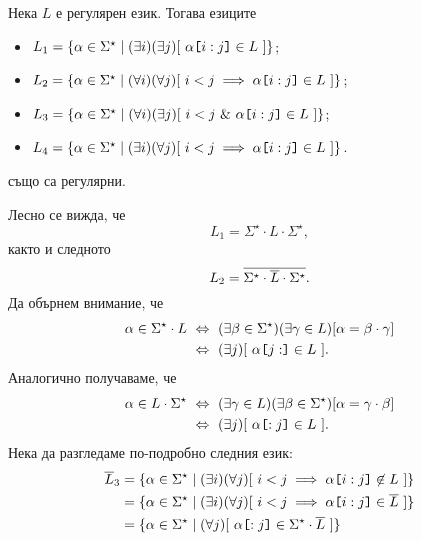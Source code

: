 \begin{extra}

  
\begin{problem}
  Нека $L$ е регулярен език. Тогава езиците
  \begin{itemize}
  \item
    $L_1 = \{ \alpha \in \Sigma^\star \mid (\exists i)(\exists j)[\ \alpha\texttt{[}{i:j}\texttt{]} \in L\ ]\}$;
  \item
    $L_2 = \{ \alpha \in \Sigma^\star \mid (\forall i)(\forall j)[\ i < j \implies \alpha\slice{i:j} \in L\ ]\}$;
  \item 
    $L_3 = \{ \alpha \in \Sigma^\star \mid (\forall i)(\exists j)[\ i < j\ \&\ \alpha\slice{i:j} \in L\ ]\}$;
  \item
    $L_4 = \{ \alpha \in \Sigma^\star \mid (\exists i)(\forall j)[\ i < j \implies \alpha\slice{i:j} \in L\ ]\}$.
  \end{itemize}
  също са регулярни.
\end{problem}
\begin{hint}
  Лесно се вижда, че
  \[L_1 = \Sigma^\star \cdot L \cdot \Sigma^\star,\]
  както и следното
  \[L_2 = \overline{\Sigma^\star \cdot \overline{L} \cdot \Sigma^\star}.\]
  Да обърнем внимание, че
  \begin{align*}
    \alpha \in \Sigma^\star \cdot L & \iff (\exists \beta \in \Sigma^\star)(\exists \gamma \in L)[ \alpha = \beta \cdot \gamma]\\
                                    & \iff (\exists j)[\ \alpha\slice{j:} \in L\ ].
  \end{align*}
  Аналогично получаваме, че
    \begin{align*}
      \alpha \in L\cdot \Sigma^\star & \iff (\exists \gamma \in L)(\exists \beta \in \Sigma^\star)[ \alpha = \gamma \cdot \beta ]\\
                                     & \iff (\exists j)[\ \alpha\slice{:j} \in L\ ].
  \end{align*}
  Нека да разгледаме по-подробно следния език:
  \begin{align*}
    \ov{L}_3 & = \{\alpha \in \Sigma^\star \mid (\exists i)(\forall j)[\ i < j \implies \alpha\slice{i:j} \not\in L\ ]\}\\
             & = \{\alpha \in \Sigma^\star \mid (\exists i)(\forall j)[\ i < j \implies \alpha\slice{i:j} \in \ov{L}\ ]\}\\
             & = \{\alpha \in \Sigma^\star \mid (\forall j)[\ \alpha\slice{:j} \in \Sigma^\star \cdot \ov{L}\ ]\}

\end{align*}
\end{hint}
\end{extra}
